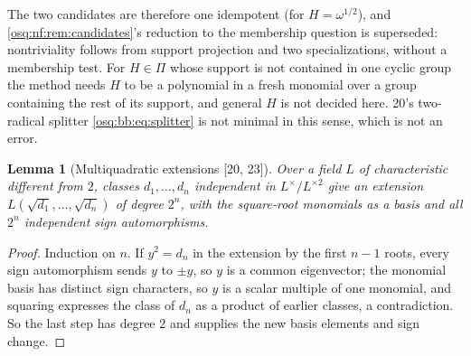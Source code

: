 \documentclass[11pt,letterpaper]{article}
\numberwithin{equation}{section}
\newtheorem{lemma}[lemma]{Lemma}
\theoremstyle{definition}
\theoremstyle{remark}
\theoremstyle{plain}
\newcommand{\src}[1]{\textup{\textsf{[#1]}}}
\begin{document}
The two candidates are therefore one idempotent (for $H=\omega^{1/2}$), and \cref{osq:nf:rem:candidates}'s reduction to the
membership question is superseded: nontriviality follows from support projection and two specializations, without a membership
test. For $H\in\Pi$ whose support is not contained in one cyclic group the method needs $H$ to be a polynomial in a fresh monomial
over a group containing the rest of its support, and general $H$ is not decided here. 20's two-radical splitter
\eqref{osq:bb:eq:splitter} is not minimal in this sense, which is not an error.

\begin{lemma}[Multiquadratic extensions \src{20, 23}]\label{osq:bb:lem:multiquadratic}
Over a field $L$ of characteristic different from $2$, classes $d_1,\dots,d_n$ independent in $L^\times/L^{\times2}$ give an extension
$L(\sqrt{d_1},\dots,\sqrt{d_n})$ of degree $2^n$, with the square-root monomials as a basis and all $2^n$ independent sign
automorphisms.
\end{lemma}
\begin{proof}
Induction on $n$. If $y^2=d_n$ in the extension by the first $n-1$ roots, every sign automorphism sends $y$ to $\pm y$, so $y$ is a
common eigenvector; the monomial basis has distinct sign characters, so $y$ is a scalar multiple of one monomial, and squaring
expresses the class of $d_n$ as a product of earlier classes, a contradiction. So the last step has degree $2$ and supplies the new
basis elements and sign change.
\end{proof}
\end{document}
